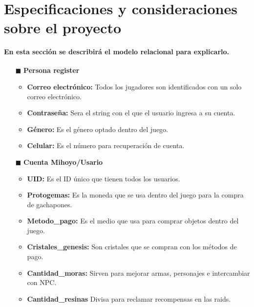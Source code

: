 \documentclass{report}
\begin{document}
\section{Especificaciones y consideraciones sobre el proyecto}
\paragraph{En esta sección se describirá el modelo relacional para explicarlo.}
\begin{itemize}
    \item[$\blacksquare$] \textbf{Persona register}
        \begin{itemize}
            \item \textbf{Correo electrónico:} Todos los jugadores son identificados con un solo correo electrónico.
            \item \textbf{Contraseña: }Sera el string con el que el usuario ingresa a su cuenta.
            \item \textbf{Género:} Es el género optado dentro del juego.
            \item \textbf{Celular:} Es el número para recuperación de cuenta.
        \end{itemize}
    \item[$\blacksquare$] \textbf{Cuenta Mihoyo/Usario}
        \begin{itemize}
            \item \textbf{UID:} Es el ID único que tienen todos los usuarios.
            \item \textbf{Protogemas:} Es la moneda que se usa dentro del juego para la compra de gachapones.
            \item \textbf{Metodo\_pago:} Es el medio que usa para comprar objetos dentro del juego.
            \item \textbf{Cristales\_genesis:} Son cristales que se compran con los métodos de pago.
            \item \textbf{Cantidad\_moras:} Sirven para mejorar armas, personajes e intercambiar con NPC.
            \item \textbf{Cantidad\_resinas} Divisa para reclamar recompensas en las raids.

\end{itemize}
\end{itemize}
\end{document}
